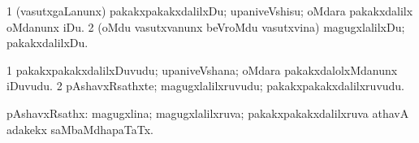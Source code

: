 \bentry
{}
\gl{\sakirx}
\bmng
\bnum
\num{1} (vasutxgaLanunx) pakakxpakakxdalilxDu; upaniveVshisu; oMdara pakakxdalilx oMdanunx iDu. 
\num{2} (oMdu vasutxvanunx beVroMdu vasutxvina) magugxlalilxDu; pakakxdalilxDu. 
\enum
\emng
\eentry

\bentry
{}
\gl{\nA}
\bmng
\bnum
\num{1} pakakxpakakxdalilxDuvudu; upaniveVshana; oMdara pakakxdalolxMdanunx iDuvudu. 
\num{2} pAshavxRsathxte; magugxlalilxruvudu; pakakxpakakxdalilxruvudu. 
\enum
\emng
\eentry

\bentry
{}
\gl{\gu}
\bmng
pAshavxRsathx: magugxlina; magugxlalilxruva; pakakxpakakxdalilxruva athavA adakekx saMbaMdhapaTaTx. 
\emng
\eentry

%
